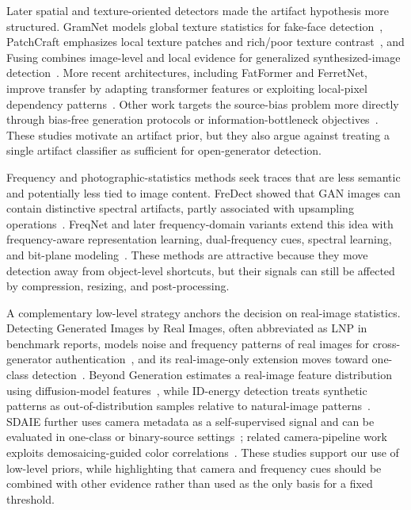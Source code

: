 \documentclass[lettersize,journal]{IEEEtran}
\begin{document}
Later spatial and texture-oriented detectors made the artifact hypothesis more structured. GramNet models global texture statistics for fake-face detection~\cite{liu2020gramnet}, PatchCraft emphasizes local texture patches and rich/poor texture contrast~\cite{zhong2023patchcraft}, and Fusing combines image-level and local evidence for generalized synthesized-image detection~\cite{ju2022fusing}. More recent architectures, including FatFormer and FerretNet, improve transfer by adapting transformer features or exploiting local-pixel dependency patterns~\cite{liu2024fatformer,liang2025ferretnet}. Other work targets the source-bias problem more directly through bias-free generation protocols or information-bottleneck objectives~\cite{guillaro2025biasfree,zhang2025vibnet}. These studies motivate an artifact prior, but they also argue against treating a single artifact classifier as sufficient for open-generator detection.

Frequency and photographic-statistics methods seek traces that are less semantic and potentially less tied to image content. FreDect showed that GAN images can contain distinctive spectral artifacts, partly associated with upsampling operations~\cite{frank2020frequency}. FreqNet and later frequency-domain variants extend this idea with frequency-aware representation learning, dual-frequency cues, spectral learning, and bit-plane modeling~\cite{tan2024freqnet,yan2025dffreq,karageorgiou2025spai,wang2025lota}. These methods are attractive because they move detection away from object-level shortcuts, but their signals can still be affected by compression, resizing, and post-processing.

A complementary low-level strategy anchors the decision on real-image statistics. Detecting Generated Images by Real Images, often abbreviated as LNP in benchmark reports, models noise and frequency patterns of real images for cross-generator authentication~\cite{liu2022realimages}, and its real-image-only extension moves toward one-class detection~\cite{bi2023realonly}. Beyond Generation estimates a real-image feature distribution using diffusion-model features~\cite{zhong2025beyond}, while ID-energy detection treats synthetic patterns as out-of-distribution samples relative to natural-image patterns~\cite{cai2025generalizable}. SDAIE further uses camera metadata as a self-supervised signal and can be evaluated in one-class or binary-source settings~\cite{zhong2026metadata}; related camera-pipeline work exploits demosaicing-guided color correlations~\cite{zhong2026color}. These studies support our use of low-level priors, while highlighting that camera and frequency cues should be combined with other evidence rather than used as the only basis for a fixed threshold.
\end{document}
